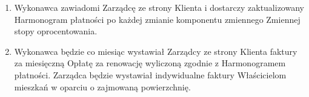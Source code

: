 \begin{enumerate}[label=\arabic*.]

\begin{center}
\end{center}

	\item Wykonawca zawiadomi Zarządcę ze strony Klienta i dostarczy zaktualizowany Harmonogram płatności po każdej zmianie komponentu zmiennego Zmiennej stopy oprocentowania.
	\item Wykonawca będzie co miesiąc wystawiał Zarządcy ze strony Klienta faktury za miesięczną Opłatę za renowację wyliczoną zgodnie z Harmonogramem płatności. Zarządca będzie wystawiał indywidualne faktury Właścicielom mieszkań w oparciu o zajmowaną powierzchnię.
\end{enumerate}
